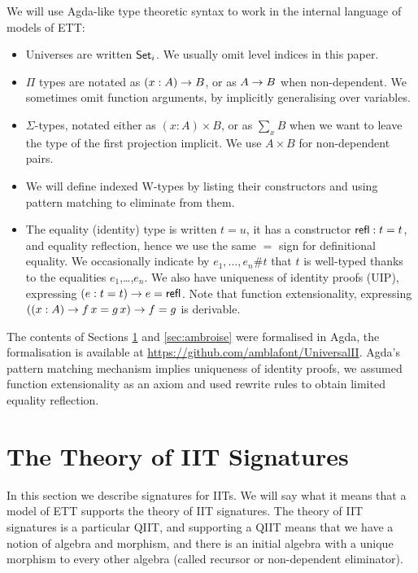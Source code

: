\documentclass[a4paper,UKenglish,cleveref, autoref]{lipics-v2019}
\begin{document}
We will use Agda-like type theoretic syntax to work in the internal
language of models of ETT:
\begin{itemize}
\item Universes are written $\mathsf{Set}_i$. We usually omit level indices in this paper.
\item $\Pi$ types are notated as $(x : A)\rightarrow B$, or as $A \rightarrow B$ when
  non-dependent. We sometimes omit function arguments, by implicitly
  generalising over variables.
\item $\Sigma$-types, notated either as $(x : A)\times B$, or as
  $\sum\limits_{x} B$ when we want to leave the type of the first
  projection implicit. We use $A \times B$ for non-dependent pairs.
\item We will define indexed W-types \cite{indexedcont} by listing
  their constructors and using pattern matching to eliminate from
  them.
\item The equality (identity) type is written $t = u$, it has a
  constructor $\mathsf{refl} : t = t$, and equality reflection, hence we use
  the same $=$ sign for definitional equality. We occasionally
  indicate by $e_1,\dots,e_n \#t$ that $t$ is well-typed thanks to the
  equalities $e_1$,\dots,$e_n$. We also have uniqueness of identity
  proofs (UIP), expressing $(e : t = t)\rightarrow e = \mathsf{refl}$. Note that
  function extensionality, expressing
  $((x : A) \rightarrow f\,x = g\,x) \rightarrow f = g$ is derivable.
\end{itemize}

The contents of Sections \ref{sec:theory_of_signatures} and
\ref{sec:ambroise} were formalised in Agda, the formalisation is
available at \url{https://github.com/amblafont/UniversalII}. Agda's
pattern matching mechanism implies uniqueness of identity proofs, we
assumed function extensionality as an axiom and used rewrite rules
\cite{cockxsprinkles} to obtain limited equality reflection.

\section{The Theory of IIT Signatures}
\label{sec:theory_of_signatures}

In this section we describe signatures for IITs. We will say what it
means that a model of ETT supports the theory of IIT signatures. The
theory of IIT signatures is a particular QIIT, and supporting a QIIT
means that we have a notion of algebra and morphism, and there is an
initial algebra with a unique morphism to every other algebra (called
recursor or non-dependent eliminator).
\end{document}
